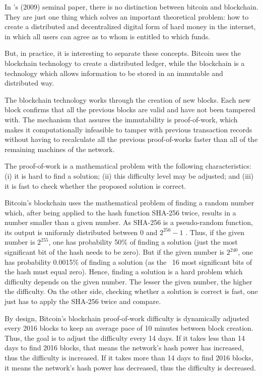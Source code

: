 In \citeauthor{nakamoto2008bitcoin}'s (2009) seminal paper, there is no distinction between bitcoin and blockchain. They are just one thing which solves an important theoretical problem: how to create a distributed and decentralized digital form of hard money in the internet, in which all users can agree as to whom is entitled to which funds.

But, in practice, it is interesting to separate these concepts. Bitcoin uses the blockchain technology to create a distributed ledger, while the blockchain is a technology which allows information to be stored in an immutable and distributed way.

The blockchain technology works through the creation of new blocks. Each new block confirms that all the previous blocks are valid and have not been tampered with. The mechanism that assures the immutability is proof-of-work, which makes it computationally infeasible to tamper with previous transaction records without having to recalculate all the previous proof-of-works faster than all of the remaining machines of the network.

The proof-of-work is a mathematical problem with the following characteristics: (i) it is hard to find a solution; (ii) this difficulty level may be adjusted; and (iii) it is fast to check whether the proposed solution is correct.

Bitcoin's blockchain uses the mathematical problem of finding a random number which, after being applied to the hash function SHA-256 twice, results in a number smaller than a given number. As SHA-256 is a pseudo-random function, its output is uniformly distributed between 0 and $2^{256}-1$ \citep{gilbert2003security}. Thus, if the given number is $2^{255}$, one has probability 50\% of finding a solution (just the most significant bit of the hash needs to be zero). But if the given number is $2^{240}$, one has probability 0.0015\% of finding a solution (as the ~16 most significant bits of the hash must equal zero). Hence, finding a solution is a hard problem which difficulty depends on the given number. The lesser the given number, the higher the difficulty. On the other side, checking whether a solution is correct is fast, one just has to apply the SHA-256 twice and compare.

By design, Bitcoin's blockchain proof-of-work difficulty is dynamically adjusted every 2016 blocks to keep an average pace of 10 minutes between block creation. Thus, the goal is to adjust the difficulty every 14 days. If it takes less than 14 days to find 2016 blocks, that means the network's hash power has increased, thus the difficulty is increased. If it takes more than 14 days to find 2016 blocks, it means the network's hash power has decreased, thus the difficulty is decreased.

